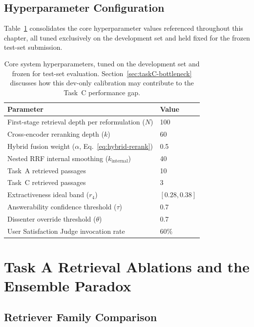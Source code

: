 \subsection{Hyperparameter Configuration}

Table~\ref{tab:hyperparams-en} consolidates the core hyperparameter values referenced throughout this chapter, all tuned exclusively on the development set and held fixed for the frozen test-set submission.

\begin{table}[h]
\centering
\small
\begin{tabular}{ll}
\toprule
\textbf{Parameter} & \textbf{Value} \\
\midrule
First-stage retrieval depth per reformulation ($N$) & 100 \\
Cross-encoder reranking depth ($k$) & 60 \\
Hybrid fusion weight ($\alpha$, Eq.~\eqref{eq:hybrid-rerank}) & 0.5 \\
Nested RRF internal smoothing ($k_{\text{internal}}$) & 40 \\
Task~A retrieved passages & 10 \\
Task~C retrieved passages & 3 \\
Extractiveness ideal band ($r_4$) & $[0.28, 0.38]$ \\
Answerability confidence threshold ($\tau$) & 0.7 \\
Dissenter override threshold ($\theta$) & 0.7 \\
User Satisfaction Judge invocation rate & $60\%$ \\
\bottomrule
\end{tabular}
\caption{Core system hyperparameters, tuned on the development set and frozen for test-set evaluation. Section~\ref{sec:taskC-bottleneck} discusses how this dev-only calibration may contribute to the Task~C performance gap.}
\label{tab:hyperparams-en}
\end{table}

\section{Task A Retrieval Ablations and the Ensemble Paradox}
\label{sec:taskA-ablations}

\subsection{Retriever Family Comparison}

